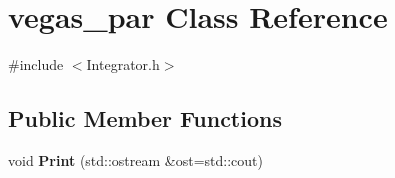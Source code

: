 \hypertarget{classvegas__par}{\section{vegas\-\_\-par Class Reference}
\label{classvegas__par}
}


{\ttfamily \#include $<$Integrator.\-h$>$}

\subsection*{Public Member Functions}
\begin{DoxyCompactItemize}
\item 
\hypertarget{classvegas__par_a730b059d3c70a835152ca7b012e6c267}{void {\bfseries Print} (std\-::ostream \&ost=std\-::cout)}\label{classvegas__par_a730b059d3c70a835152ca7b012e6c267}

\end{DoxyCompactItemize}
